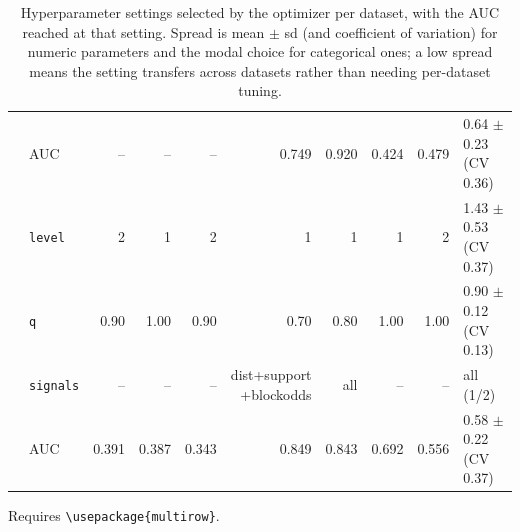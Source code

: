 \begin{table}[t]
\begin{tabular}{llrrrrrrrl}
     & AUC & -- & -- & -- & 0.749 & 0.920 & 0.424 & 0.479 & 0.64 $\pm$ 0.23 (CV 0.36) \\
    \addlinespace
    \multirow{4}{*}{GTopo2} & \texttt{level} & 2 & 1 & 2 & 1 & 1 & 1 & 2 & 1.43 $\pm$ 0.53 (CV 0.37) \\
     & \texttt{q} & 0.90 & 1.00 & 0.90 & 0.70 & 0.80 & 1.00 & 1.00 & 0.90 $\pm$ 0.12 (CV 0.13) \\
     & \texttt{signals} & -- & -- & -- & \shortstack{dist+support\\+blockodds} & all & -- & -- & all (1/2) \\
     & AUC & 0.391 & 0.387 & 0.343 & 0.849 & 0.843 & 0.692 & 0.556 & 0.58 $\pm$ 0.22 (CV 0.37) \\
    \bottomrule
  \end{tabular}
  \par\medskip\footnotesize Requires \texttt{\textbackslash usepackage\{multirow\}}.
  \caption{Hyperparameter settings selected by the optimizer per dataset, with the AUC reached at that setting. Spread is mean $\pm$ sd (and coefficient of variation) for numeric parameters and the modal choice for categorical ones; a low spread means the setting transfers across datasets rather than needing per-dataset tuning.}
  \label{tab:parameter-stability}
\end{table}
